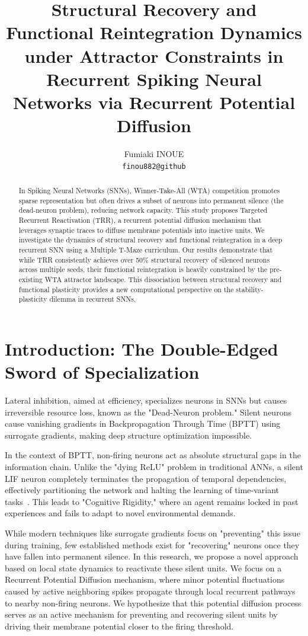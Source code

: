 \documentclass{article}
\title{Structural Recovery and Functional Reintegration Dynamics under Attractor Constraints in Recurrent Spiking Neural Networks via Recurrent Potential Diffusion}
\author{
  Fumiaki INOUE \\
  \texttt{finou882@github} \\
}
\begin{document}
\maketitle

\begin{abstract}
In Spiking Neural Networks (SNNs), Winner-Take-All (WTA) competition promotes sparse representation but often drives a subset of neurons into permanent silence (the dead-neuron problem), reducing network capacity. This study proposes Targeted Recurrent Reactivation (TRR), a recurrent potential diffusion mechanism that leverages synaptic traces to diffuse membrane potentials into inactive units. We investigate the dynamics of structural recovery and functional reintegration in a deep recurrent SNN using a Multiple T-Maze curriculum. Our results demonstrate that while TRR consistently achieves over 50\% structural recovery of silenced neurons across multiple seeds, their functional reintegration is heavily constrained by the pre-existing WTA attractor landscape. This dissociation between structural recovery and functional plasticity provides a new computational perspective on the stability-plasticity dilemma in recurrent SNNs.
\end{abstract}


\section{Introduction: The Double-Edged Sword of Specialization}
Lateral inhibition, aimed at efficiency, specializes neurons in SNNs but causes irreversible resource loss, known as the "Dead-Neuron problem." Silent neurons cause vanishing gradients in Backpropagation Through Time (BPTT) using surrogate gradients, making deep structure optimization impossible. 

In the context of BPTT, non-firing neurons act as absolute structural gaps in the information chain. Unlike the "dying ReLU" problem in traditional ANNs, a silent LIF neuron completely terminates the propagation of temporal dependencies, effectively partitioning the network and halting the learning of time-variant tasks~\cite{Zenke_2018}. This leads to "Cognitive Rigidity," where an agent remains locked in past experiences and fails to adapt to novel environmental demands.

While modern techniques like surrogate gradients focus on "preventing" this issue during training, few established methods exist for "recovering" neurons once they have fallen into permanent silence. In this research, we propose a novel approach based on local state dynamics to reactivate these silent units. We focus on a Recurrent Potential Diffusion mechanism, where minor potential fluctuations caused by active neighboring spikes propagate through local recurrent pathways to nearby non-firing neurons. We hypothesize that this potential diffusion process serves as an active mechanism for preventing and recovering silent units by driving their membrane potential closer to the firing threshold.
\end{document}
